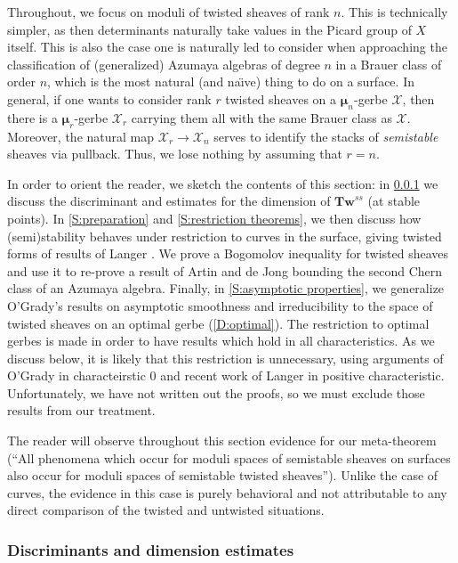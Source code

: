 \documentclass[11pt]{amsart}
\newcommand{\ms}[1]{\mathscr #1}
\newcommand{\m}{\boldsymbol{\mu}}
\renewcommand{\[}{[\!\hspace{0.03em}[}
\renewcommand{\]}{]\!\hspace{0.03em}]}
\renewcommand{\(}{(\!\hspace{0.03em}(}
\renewcommand{\)}{)\!\hspace{0.03em})}
\newcommand{\Tw}{\mathbf{Tw}}
\theoremstyle{definition}
\theoremstyle{remark}
\begin{document}
Throughout, we focus on moduli of twisted sheaves of rank $n$.  This 
is technically simpler, as then determinants naturally take values in the 
Picard group of $X$ itself.  This is also the case one is naturally 
led to consider when approaching the classification of (generalized) 
Azumaya algebras of degree $n$ in a Brauer class of order $n$, which 
is the most natural (and na\"\i ve) thing to do on a surface.  In 
general, if one wants to consider rank $r$ twisted sheaves on a 
$\m_{n}$-gerbe $\ms 
X$, then there is a $\m_{r}$-gerbe $\ms X_{r}$ carrying them all with the same 
Brauer class as $\ms X$.  Moreover, the natural map $\ms X_{r}\to\ms 
X_{n}$ serves to identify the stacks of \emph{semistable\/} sheaves via pullback.  
Thus, we lose nothing by assuming that $r=n$.

In order to orient the reader, we sketch the contents of this 
section: in \ref{S:discrim} we discuss the discriminant and estimates for 
the dimension of $\Tw^{ss}$ (at stable points).  In \ref{S:preparation} and 
\ref{S:restriction theorems}, we then discuss how (semi)stability behaves under 
restriction to curves in the surface, giving twisted forms of results 
of Langer \cite{langer}.  We prove a Bogomolov inequality for twisted 
sheaves and use it to re-prove a result of Artin and de Jong bounding 
the second Chern class of an Azumaya algebra.  
Finally, in \ref{S:asymptotic properties}, we generalize 
O'Grady's results on asymptotic smoothness and irreducibility to the 
space of twisted sheaves on an optimal gerbe (\ref{D:optimal}).  The 
restriction to optimal gerbes is made in order to have results which 
hold in all characteristics.  As we discuss below, it is likely that 
this restriction is unnecessary, using arguments of O'Grady in 
characteirstic $0$ and recent work of Langer in positive 
characteristic.  Unfortunately, we have not written out the proofs, so 
we must exclude those results from our treatment.

The reader will observe throughout this section evidence for our 
meta-theorem (``All phenomena which occur for moduli spaces of 
semistable sheaves on surfaces also occur for moduli spaces of 
semistable twisted sheaves'').  Unlike the case of curves, the 
evidence in this case is purely behavioral and not attributable to any 
direct comparison of the twisted and untwisted situations.

\subsubsection{Discriminants and dimension estimates}\label{S:discrim}
\end{document}
